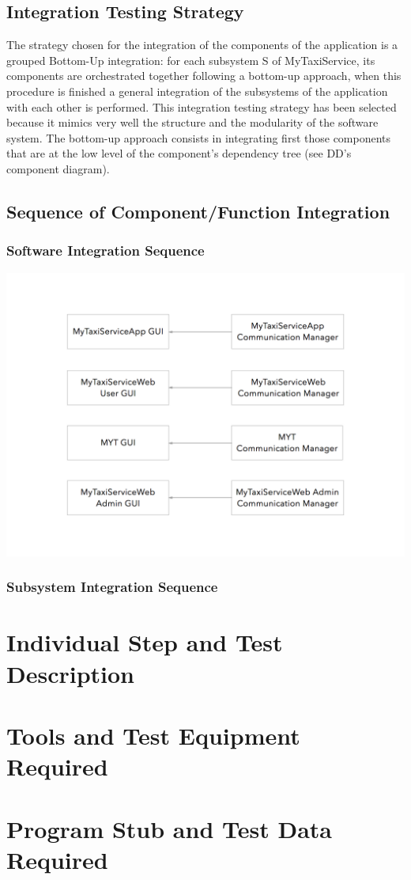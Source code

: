 \documentclass[11pt,titlepage]{article} %
\begin{document}
\subsection{Integration Testing Strategy}
  The strategy chosen for the integration of the components of the application is a grouped Bottom-Up integration: 
  for each subsystem S of MyTaxiService, its components are orchestrated together following a bottom-up approach, 
  when this procedure is finished a general integration of the subsystems of the application with each other is performed.\newline
  This integration testing strategy has been selected because it mimics very well the structure and the modularity of the software system.
  The bottom-up approach consists in integrating first those components that are at the low level of the component's dependency tree
  (see DD's component diagram).
  
\subsection{Sequence of Component/Function Integration} 
  \subsubsection{Software Integration Sequence}
    \includegraphics[scale=0.3]{Integration-1.png}
  \subsubsection{Subsystem Integration Sequence}

\section{Individual Step and Test Description}

\section{Tools and Test Equipment Required}

\section{Program Stub and Test Data Required}
\end{document}
